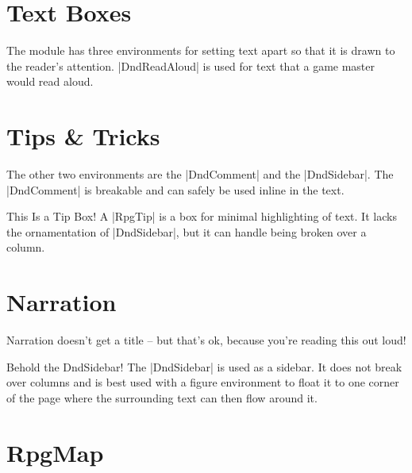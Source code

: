 	\section{Text Boxes}

	The module has three environments for setting text apart so that it is drawn to the reader's attention. |DndReadAloud| is used for text that a game master would read aloud.
	\section{Tips \& Tricks}
	The other two environments are the |DndComment| and the |DndSidebar|. The |DndComment| is breakable and can safely be used inline in the text.

	\begin{RpgTip}{This Is a Tip Box!}
	A |RpgTip| is a box for minimal highlighting of text. It lacks the ornamentation of |DndSidebar|, but it can handle being broken over a column.
	\end{RpgTip}



	\section{Narration}

	\begin{RpgNarration}
		Narration doesn't get a title -- but that's ok, because you're reading this out loud!
	\end{RpgNarration}

	\begin{RpgSidebar}[]{Behold the DndSidebar!}
  The |DndSidebar| is used as a sidebar. It does not break over columns and is best used with a figure environment to float it to one corner of the page where the surrounding text can then flow around it.
\end{RpgSidebar}

		\section{RpgMap}

